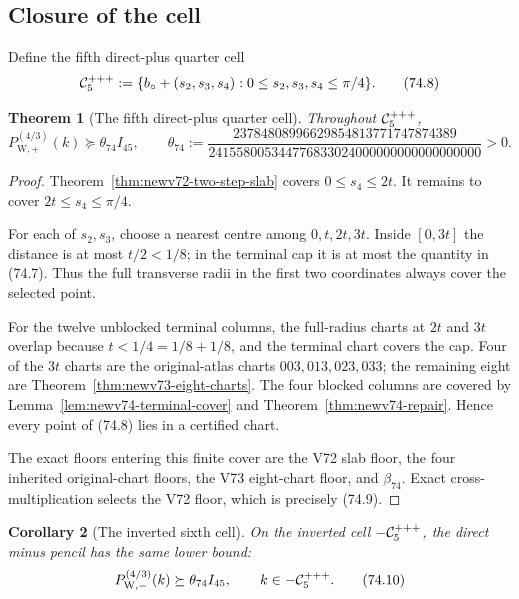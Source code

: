 \documentclass[11pt,oneside]{article}
\newtheorem{theorem}{Theorem}[section]
\newtheorem{corollary}[theorem]{Corollary}
\theoremstyle{definition}
\theoremstyle{remark}
\begin{document}
\subsection{Closure of the cell}

Define the fifth direct-plus quarter cell
\[
 {\cal C}^{+++}_5:=
 \{b_\circ+(s_2,s_3,s_4):
          0\le s_2,s_3,s_4\le\pi/4\}.                  \tag{74.8}
\]

\begin{theorem}[The fifth direct-plus quarter cell]
\label{thm:newv74-fifth-cell}
Throughout \({\cal C}^{+++}_5\),
\[
 P_{\mathrm W,+}^{(4/3)}(k)
 \succeq\theta_{74}I_{45},\qquad
 \theta_{74}:=
 \frac{23784808996629854813771747874389}
 {241558005344776833024000000000000000000}>0.          \tag{74.9}
\]
\end{theorem}

\begin{proof}
Theorem~\ref{thm:newv72-two-step-slab} covers
\(0\le s_4\le2t\).  It remains to cover
\(2t\le s_4\le\pi/4\).

For each of \(s_2,s_3\), choose a nearest centre among
\(0,t,2t,3t\).  Inside \([0,3t]\) the distance is at most
\(t/2<1/8\); in the terminal cap it is at most the quantity in
(74.7).  Thus the full transverse radii in the first two
coordinates always cover the selected point.

For the twelve unblocked terminal columns, the full-radius charts
at \(2t\) and \(3t\) overlap because \(t<1/4=1/8+1/8\), and the
terminal chart covers the cap.  Four of the \(3t\) charts are the
original-atlas charts \(003,013,023,033\); the remaining eight are
Theorem~\ref{thm:newv73-eight-charts}.  The four blocked columns are
covered by Lemma~\ref{lem:newv74-terminal-cover} and
Theorem~\ref{thm:newv74-repair}.  Hence every point of (74.8) lies
in a certified chart.

The exact floors entering this finite cover are the V72 slab floor,
the four inherited original-chart floors, the V73 eight-chart
floor, and \(\beta_{74}\).  Exact cross-multiplication selects the
V72 floor, which is precisely (74.9).
\end{proof}

\begin{corollary}[The inverted sixth cell]
\label{cor:newv74-inverted-cell}
On the inverted cell \(-{\cal C}^{+++}_5\), the direct minus pencil
has the same lower bound:
\[
 P_{\mathrm W,-}^{(4/3)}(k)
 \succeq\theta_{74}I_{45},
 \qquad k\in-{\cal C}^{+++}_5.                          \tag{74.10}
\]
\end{corollary}
\end{document}
